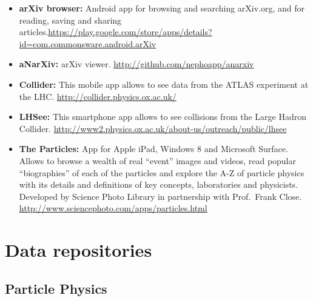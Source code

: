 \begin{itemize}
\item
  \textbf{arXiv browser:} Android app for browsing and searching
  arXiv.org, and for reading, saving and sharing
  articles.\url{https://play.google.com/store/apps/details?id=com.commonsware.android.arXiv}
\item
  \textbf{aNarXiv:} arXiv viewer.
  \url{http://github.com/nephoapp/anarxiv}
\item
  \textbf{Collider:} This mobile app allows to see data from the ATLAS
  experiment at the LHC. \url{http://collider.physics.ox.ac.uk/}
\item
  \textbf{LHSee:} This smartphone app allows to see collisions from the
  Large Hadron Collider.
  \url{http://www2.physics.ox.ac.uk/about-us/outreach/public/lhsee}
\item
  \textbf{The Particles:} App for Apple iPad, Windows 8 and Microsoft
  Surface. Allows to browse a wealth of real ``event'' images and
  videos, read popular ``biographies'' of each of the particles and
  explore the A-Z of particle physics with its details and definitions
  of key concepts, laboratories and physicists. Developed by Science
  Photo Library in partnership with Prof.~Frank Close.
  \url{http://www.sciencephoto.com/apps/particles.html}
\end{itemize}

\section{Data repositories}\label{data-repositories}

\subsection{Particle Physics}\label{particle-physics}

